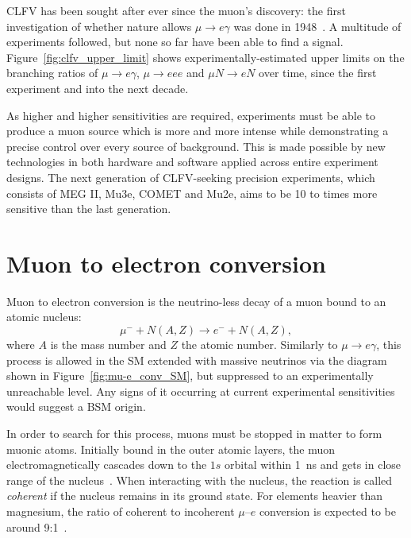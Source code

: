CLFV has been sought after ever since the muon's discovery: the first
investigation of whether nature allows $\mu \rightarrow e \gamma$ was done in
1948~\cite{PhysRev.73.257}. A multitude of experiments followed, but none so far
have been able to find a signal. Figure~\ref{fig:clfv_upper_limit} shows
experimentally-estimated upper limits on the branching ratios of $\mu
\rightarrow e\gamma$, $\mu\rightarrow eee$ and $\mu N \rightarrow e N$ over
time, since the first experiment and into the next decade. 

As higher and higher sensitivities are required, experiments must be able to
produce a muon source which is more and more intense while demonstrating a
precise control over every source of background. This is made possible by new
technologies in both hardware and software applied across entire experiment
designs. The next generation of CLFV-seeking precision experiments, which
consists of MEG II, Mu3e, COMET and Mu2e, aims to be 10 to 
times more sensitive than the last generation.


\section{Muon to electron conversion}
Muon to electron conversion is the neutrino-less decay of a muon bound to an
atomic nucleus:
$$
\mu^- + N(A, Z) \rightarrow e^- + N(A, Z),
$$
where $A$ is the mass number and $Z$ the atomic number.
Similarly to $\mu\rightarrow e\gamma$, this process is allowed in the SM
extended with massive neutrinos via the diagram shown in
Figure~\ref{fig:mu-e_conv_SM}, but suppressed to an experimentally
unreachable level. Any signs of it occurring at current experimental
sensitivities would suggest a BSM origin.

In order to search for this process, muons must be stopped in matter to form
muonic atoms. Initially bound in the outer atomic layers, the muon
electromagnetically cascades down to the $1s$ orbital within \SI{1}{\ns}
and gets in close range of the nucleus~\cite{Knecht2020}. 
When interacting with the nucleus, the reaction is called \emph{coherent} if the
nucleus remains in its ground state. For elements heavier than magnesium, the
ratio of coherent to incoherent $\mu$--$e$ conversion is expected to be around
9:1~\cite{CHIANG1993526}.

